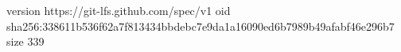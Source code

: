 version https://git-lfs.github.com/spec/v1
oid sha256:338611b536f62a7f813434bbdebc7e9da1a16090ed6b7989b49afabf46e296b7
size 339
